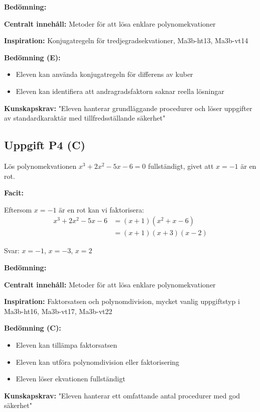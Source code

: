 \documentclass[12pt]{article}
\begin{document}
\begin{refbox}
\textbf{Bedömning:}

\textbf{Centralt innehåll:} Metoder för att lösa enklare polynomekvationer

\textbf{Inspiration:} Konjugatregeln för tredjegradsekvationer, Ma3b-ht13, Ma3b-vt14

\textbf{Bedömning (E):}
\begin{itemize}
    \item Eleven kan använda konjugatregeln för differens av kuber
    \item Eleven kan identifiera att andragradsfaktorn saknar reella lösningar
\end{itemize}

\textbf{Kunskapskrav:} "Eleven hanterar grundläggande procedurer och löser uppgifter av standardkaraktär med tillfredsställande säkerhet"
\end{refbox}

\subsection*{Uppgift P4 (C)}
Lös polynomekvationen $x^3 + 2x^2 - 5x - 6 = 0$ fullständigt, givet att $x = -1$ är en rot.

\begin{facitbox}
\textbf{Facit:}

Eftersom $x = -1$ är en rot kan vi faktorisera:
\begin{align*}
x^3 + 2x^2 - 5x - 6 &= (x + 1)(x^2 + x - 6) \\
&= (x + 1)(x + 3)(x - 2)
\end{align*}

Svar: $x = -1$, $x = -3$, $x = 2$
\end{facitbox}

\begin{refbox}
\textbf{Bedömning:}

\textbf{Centralt innehåll:} Metoder för att lösa enklare polynomekvationer

\textbf{Inspiration:} Faktorsatsen och polynomdivision, mycket vanlig uppgiftstyp i Ma3b-ht16, Ma3b-vt17, Ma3b-vt22

\textbf{Bedömning (C):}
\begin{itemize}
    \item Eleven kan tillämpa faktorsatsen
    \item Eleven kan utföra polynomdivision eller faktorisering
    \item Eleven löser ekvationen fullständigt
\end{itemize}

\textbf{Kunskapskrav:} "Eleven hanterar ett omfattande antal procedurer med god säkerhet"
\end{refbox}
\end{document}
